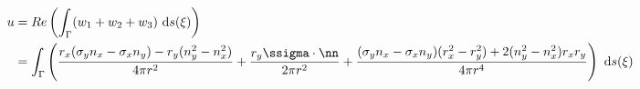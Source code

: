 \begin{align*}
	u &= Re\left(\int_\Gamma (w_1 + w_2 + w_3)~\text{d}s(\xi)\right)\\
	 &= \int_\Gamma \left( \frac{r_x(\sigma_y n_x - \sigma_x n_y) - r_y(n_y^2 - n_x^2)}{4\pi r^2} + \frac{r_y\ssigma\cdot\nn}{2\pi r^2} + \frac{(\sigma_y n_x -\sigma_xn_y)(r_x^2 - r_y^2) + 2(n_y^2 - n_x^2)r_x r_y}{4\pi r^4}\right)~\text{d}s(\xi)
\end{align*}